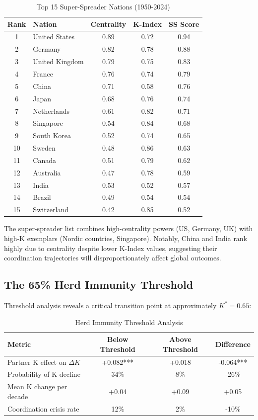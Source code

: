 \documentclass[12pt,a4paper]{article}
\begin{document}
\begin{table}[H]
\centering
\caption{Top 15 Super-Spreader Nations (1950-2024)}
\label{tab:superspreaders}
\begin{tabular}{clccc}
\toprule
\textbf{Rank} & \textbf{Nation} & \textbf{Centrality} & \textbf{K-Index} & \textbf{SS Score} \\
\midrule
1 & United States & 0.89 & 0.72 & 0.94 \\
2 & Germany & 0.82 & 0.78 & 0.88 \\
3 & United Kingdom & 0.79 & 0.75 & 0.83 \\
4 & France & 0.76 & 0.74 & 0.79 \\
5 & China & 0.71 & 0.58 & 0.76 \\
6 & Japan & 0.68 & 0.76 & 0.74 \\
7 & Netherlands & 0.61 & 0.82 & 0.71 \\
8 & Singapore & 0.54 & 0.84 & 0.68 \\
9 & South Korea & 0.52 & 0.74 & 0.65 \\
10 & Sweden & 0.48 & 0.86 & 0.63 \\
11 & Canada & 0.51 & 0.79 & 0.62 \\
12 & Australia & 0.47 & 0.78 & 0.59 \\
13 & India & 0.53 & 0.52 & 0.57 \\
14 & Brazil & 0.49 & 0.54 & 0.54 \\
15 & Switzerland & 0.42 & 0.85 & 0.52 \\
\bottomrule
\end{tabular}
\end{table}

The super-spreader list combines high-centrality powers (US, Germany, UK) with high-K exemplars (Nordic countries, Singapore). Notably, China and India rank highly due to centrality despite lower K-Index values, suggesting their coordination trajectories will disproportionately affect global outcomes.

\subsection{The 65\% Herd Immunity Threshold}

Threshold analysis reveals a critical transition point at approximately $K^* = 0.65$:

\begin{table}[H]
\centering
\caption{Herd Immunity Threshold Analysis}
\label{tab:threshold}
\begin{tabular}{lccc}
\toprule
\textbf{Metric} & \textbf{Below Threshold} & \textbf{Above Threshold} & \textbf{Difference} \\
\midrule
Partner K effect on $\Delta K$ & +0.082*** & +0.018 & -0.064*** \\
Probability of K decline & 34\% & 8\% & -26\% \\
Mean K change per decade & +0.04 & +0.09 & +0.05 \\
Coordination crisis rate & 12\% & 2\% & -10\% \\
\bottomrule
\end{tabular}
\end{table}
\end{document}
